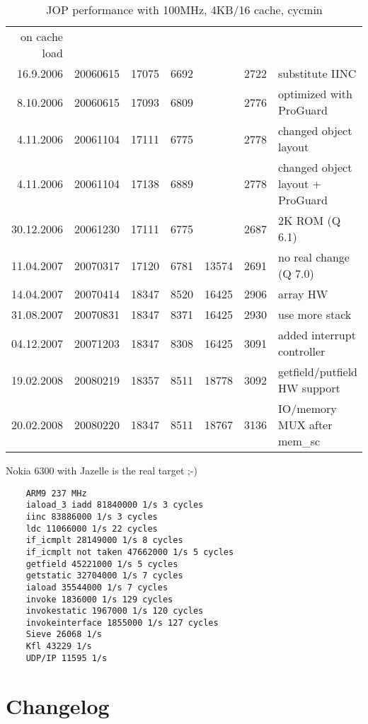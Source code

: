 \documentclass[a4paper,12pt]{scrartcl}
\begin{document}
\begin{table}
\begin{tabular}{rrrrrrl}
        on cache load\\
        16.9.2006 & 20060615 & 17075 & 6692 & & 2722 & substitute
        IINC\\
        8.10.2006 & 20060615 & 17093 & 6809 & & 2776 & optimized
        with ProGuard\\
        4.11.2006 & 20061104 & 17111 & 6775 & & 2778 & changed
        object layout\\
        4.11.2006 & 20061104 & 17138 & 6889 & & 2778 & changed
        object layout + ProGuard\\
        30.12.2006 & 20061230 & 17111 & 6775 & & 2687 & 2K ROM (Q 6.1)\\
        11.04.2007 & 20070317 & 17120 & 6781 & 13574 & 2691 & no real
        change (Q 7.0)\\
        14.04.2007 & 20070414 & 18347 & 8520 & 16425 & 2906 & array HW \\
        31.08.2007 & 20070831 & 18347 & 8371 & 16425 & 2930 & use more stack \\
        04.12.2007 & 20071203 & 18347 & 8308 & 16425 & 3091 & added interrupt controller \\
        19.02.2008 & 20080219 & 18357 & 8511 & 18778 & 3092 & getfield/putfield HW support \\
        20.02.2008 & 20080220 & 18347 & 8511 & 18767 & 3136 & IO/memory MUX after mem\_sc \\
        \bottomrule

    \end{tabular}
    \caption{JOP performance with 100MHz, 4KB/16 cache, cycmin}
    \label{tab:perf}

\end{table}
Nokia 6300 with Jazelle is the real target ;-)

\begin{verbatim}
    ARM9 237 MHz
    iaload_3 iadd 81840000 1/s 3 cycles
    iinc 83886000 1/s 3 cycles
    ldc 11066000 1/s 22 cycles
    if_icmplt 28149000 1/s 8 cycles
    if_icmplt not taken 47662000 1/s 5 cycles
    getfield 45221000 1/s 5 cycles
    getstatic 32704000 1/s 7 cycles
    iaload 35544000 1/s 7 cycles
    invoke 1836000 1/s 129 cycles
    invokestatic 1967000 1/s 120 cycles
    invokeinterface 1855000 1/s 127 cycles
    Sieve 26068 1/s
    Kfl 43229 1/s
    UDP/IP 11595 1/s
\end{verbatim}

\section{Changelog}
\end{document}
